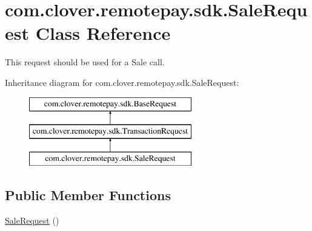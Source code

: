 \hypertarget{classcom_1_1clover_1_1remotepay_1_1sdk_1_1_sale_request}{}\section{com.\+clover.\+remotepay.\+sdk.\+Sale\+Request Class Reference}
\label{classcom_1_1clover_1_1remotepay_1_1sdk_1_1_sale_request}


This request should be used for a Sale call.  


Inheritance diagram for com.\+clover.\+remotepay.\+sdk.\+Sale\+Request\+:\begin{figure}[H]
\begin{center}
\leavevmode
\includegraphics[height=3.000000cm]{classcom_1_1clover_1_1remotepay_1_1sdk_1_1_sale_request}
\end{center}
\end{figure}
\subsection*{Public Member Functions}
\begin{DoxyCompactItemize}
\item 
\hyperlink{classcom_1_1clover_1_1remotepay_1_1sdk_1_1_sale_request_a08796114adcaa9d1a24cfb58232b6ab1}{Sale\+Request} ()
\end{DoxyCompactItemize}

